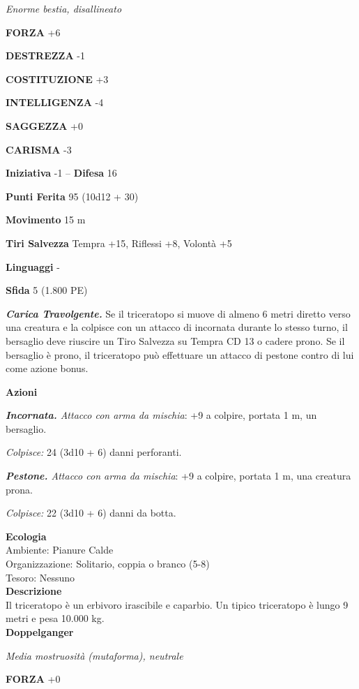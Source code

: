 \begin{multicols}{2}
\emph{Enorme bestia, disallineato}

\textbf{FORZA} +6

\textbf{DESTREZZA} -1

\textbf{COSTITUZIONE} +3

\textbf{INTELLIGENZA} -4

\textbf{SAGGEZZA} +0

\textbf{CARISMA} -3

\textbf{Iniziativa} -1 -- \textbf{Difesa} 16

\textbf{Punti Ferita} 95 (10d12 + 30)

\textbf{Movimento} 15 m

\textbf{Tiri Salvezza} Tempra +15, Riflessi +8, Volontà +5

\textbf{Linguaggi} -

\textbf{Sfida} 5 (1.800 PE)

\emph{\textbf{Carica Travolgente.}} Se il triceratopo si muove di almeno 6 metri diretto verso una creatura e la colpisce con un attacco di incornata durante lo stesso turno, il bersaglio deve riuscire un Tiro Salvezza su Tempra CD 13 o cadere prono. Se il bersaglio è prono, il triceratopo può effettuare un attacco di pestone contro di lui come azione bonus.

\textbf{Azioni}

\emph{\textbf{Incornata.} Attacco con arma da mischia}: +9 a colpire,
portata 1 m, un bersaglio.

\emph{Colpisce:} 24 (3d10 + 6) danni perforanti.

\emph{\textbf{Pestone.} Attacco con arma da mischia}: +9 a colpire,
portata 1 m, una creatura prona.

\emph{Colpisce:} 22 (3d10 + 6) danni da botta.

\textbf{Ecologia}\\
Ambiente: Pianure Calde\\
Organizzazione: Solitario, coppia o branco (5-8)\\
Tesoro: Nessuno\\
\textbf{Descrizione}\\
Il triceratopo è un erbivoro irascibile e caparbio. Un tipico triceratopo è lungo 9 metri e pesa 10.000 kg.\\


\medskip{}\textbf{Doppelganger}

\emph{Media mostruosità (mutaforma), neutrale}

\textbf{FORZA} +0


\end{multicols}
